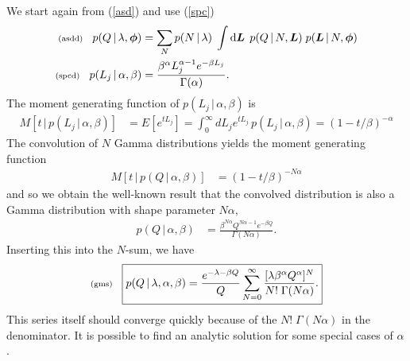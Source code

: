 \documentclass[11pt]{article}
\newcommand{\lleq}[1]{\label{#1} }
\renewcommand{\lleq}[1]{\label{#1} {\scriptstyle {\rm (#1)}} \hspace*{2ex} }
\newcommand{\cond}{\,|\,}
\newcommand{\rmdx}[1]{\dd{#1}} %
\begin{document}
We start again from (\ref{asd}) and use (\ref{spc})
\begin{align}
  \lleq{asdd}
  p(Q\cond \lambda,\bmphi)
  &= \sum_N
    p(N\cond \lambda)\;
    \int \rmdx{\bmL}\;
    p(Q\cond N,\bmL)\;
    p(\bmL\cond N,\bmphi)\\
  \lleq{spcd}
  p(L_j\cond \alpha,\beta) 
  &= \frac{\beta^\alpha L_j^{\alpha-1}e^{-\beta L_j}}{\Gamma(\alpha)}.
\end{align}
The moment generating function of $p(L_j\cond \alpha,\beta)$ is
\begin{align}
  M[t\cond p(L_j\cond \alpha,\beta) ]
  &= E[e^{tL_j}] = \int_0^\infty dL_j e^{tL_j}\,p(L_j\cond \alpha,\beta) 
    = (1 - t/\beta)^{-\alpha}
\end{align}
The convolution of $N$ Gamma distributions yields the moment generating
function
\begin{align}
  M[t\cond p(Q\cond \alpha,\beta) ]
  &= (1-t/\beta)^{-N\alpha}
\end{align}
and so we obtain the well-known result that the convolved distribution
is also a Gamma distribution with shape parameter $N\alpha$,
\begin{align}
  p(Q\cond \alpha,\beta) 
  &= \frac{\beta^{N\alpha} Q^{N\alpha-1}e^{-\beta Q}}{\Gamma(N\alpha)}.
\end{align}
Inserting this into the $N$-sum, we have
\begin{equation}
  \lleq{gms}
  \boxed{
  p(Q\cond \lambda,\alpha,\beta) 
  = \frac{e^{-\lambda - \beta Q}}{Q}
    \sum_{N=0}^\infty 
    \frac{[\lambda \beta^\alpha Q^\alpha]^N}{N!\;\Gamma(N\alpha)}.
    }
\end{equation}
This series itself should converge quickly because of the
$N!\;\Gamma(N\alpha)$ in the denominator. It is possible to find an
analytic solution for some special cases of $\alpha$.
\end{document}
